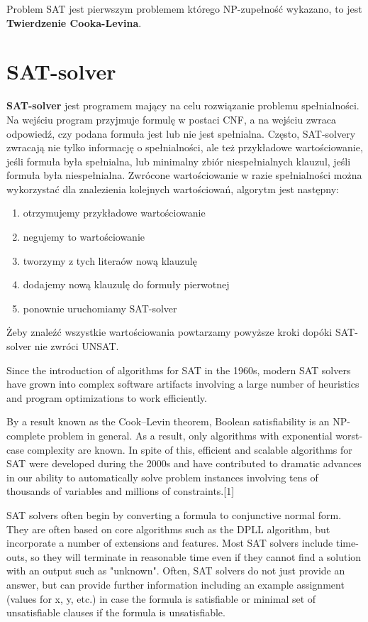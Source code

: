 \documentclass[a4paper,12pt,oneside]{book}
\theoremstyle{definition}
\begin{document}
Problem SAT jest pierwszym problemem którego NP-zupełność wykazano, to jest \textbf{Twierdzenie Cooka-Levina}.

\section{SAT-solver}

\textbf{SAT-solver} jest programem mający na celu rozwiązanie problemu spełnialności. Na wejściu program przyjmuje formulę w postaci CNF, a na wejściu zwraca odpowiedź, czy podana formuła jest lub nie jest spełnialna. Często, SAT-solvery zwracają nie tylko informację o spełnialności, ale też przykładowe wartościowanie, jeśli formuła była spełnialna, lub minimalny zbiór niespełnialnych klauzul, jeśli formuła była niespełnialna. Zwrócone wartościowanie w razie spełnialności można wykorzystać dla znalezienia kolejnych wartościowań, algorytm jest następny: 

\begin{enumerate}
    \item otrzymujemy przykładowe wartościowanie
    \item negujemy to wartościowanie
    \item tworzymy z tych literaów nową klauzulę 
    \item dodajemy nową klauzulę do formuły pierwotnej
    \item ponownie uruchomiamy SAT-solver
\end{enumerate}

Żeby znaleźć wszystkie wartościowania powtarzamy powyższe kroki dopóki SAT-solver nie zwróci UNSAT.

Since the introduction of algorithms for SAT in the 1960s, modern SAT solvers have grown into complex software artifacts involving a large number of heuristics and program optimizations to work efficiently.

By a result known as the Cook–Levin theorem, Boolean satisfiability is an NP-complete problem in general. As a result, only algorithms with exponential worst-case complexity are known. In spite of this, efficient and scalable algorithms for SAT were developed during the 2000s and have contributed to dramatic advances in our ability to automatically solve problem instances involving tens of thousands of variables and millions of constraints.[1]

SAT solvers often begin by converting a formula to conjunctive normal form. They are often based on core algorithms such as the DPLL algorithm, but incorporate a number of extensions and features. Most SAT solvers include time-outs, so they will terminate in reasonable time even if they cannot find a solution with an output such as "unknown". Often, SAT solvers do not just provide an answer, but can provide further information including an example assignment (values for x, y, etc.) in case the formula is satisfiable or minimal set of unsatisfiable clauses if the formula is unsatisfiable.
\end{document}
